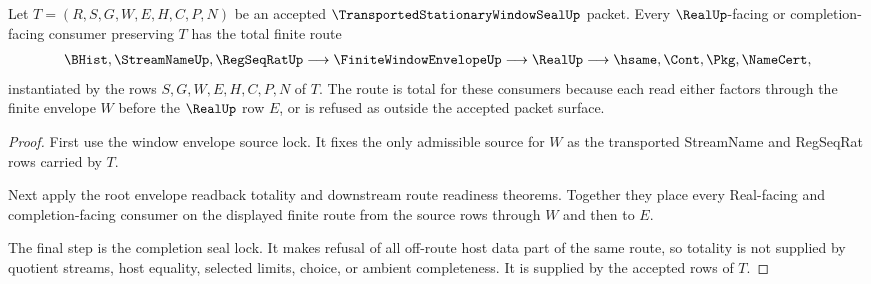 \begin{theorem}
\label{thm:transported-stationary-window-seal-real-completion-route-totality}
Let $T=(R,S,G,W,E,H,C,P,N)$ be an accepted $\TransportedStationaryWindowSealUp$ packet. Every $\RealUp$-facing or completion-facing consumer preserving $T$ has the total finite route
$$
\begin{aligned}
  \BHist,\StreamNameUp,\RegSeqRatUp
  \longrightarrow
  \FiniteWindowEnvelopeUp
  \longrightarrow
  \RealUp
  \longrightarrow
  \hsame,\Cont,\Pkg,\NameCert ,
\end{aligned}
$$
instantiated by the rows $S,G,W,E,H,C,P,N$ of $T$. The route is total for these consumers because each read either factors through the finite envelope $W$ before the $\RealUp$ row $E$, or is refused as outside the accepted packet surface.
\end{theorem}
\begin{proof}
First use the window envelope source lock. It fixes the only admissible source for $W$ as the transported StreamName and RegSeqRat rows carried by $T$.

Next apply the root envelope readback totality and downstream route readiness theorems. Together they place every Real-facing and completion-facing consumer on the displayed finite route from the source rows through $W$ and then to $E$.

The final step is the completion seal lock. It makes refusal of all off-route host data part of the same route, so totality is not supplied by quotient streams, host equality, selected limits, choice, or ambient completeness. It is supplied by the accepted rows of $T$.
\end{proof}

